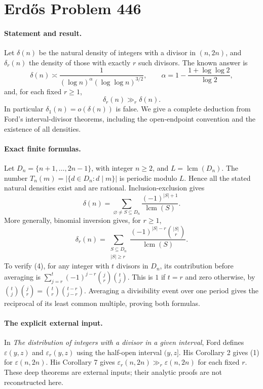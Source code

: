 \section*{Erd\H{o}s Problem 446}

\paragraph{Statement and result.}
Let \(\delta(n)\) be the natural density of integers with a divisor in
\((n,2n)\), and \(\delta_r(n)\) the density of those with exactly
\(r\) such divisors. The known answer is
\[
 \delta(n)\asymp
 \frac1{(\log n)^\alpha(\log\log n)^{3/2}},\qquad
 \alpha=1-\frac{1+\log\log2}{\log2},
 \tag{1}
\]
and, for each fixed \(r\geq1\),
\[
 \delta_r(n)\gg_r\delta(n).
 \tag{2}
\]
In particular \(\delta_1(n)=o(\delta(n))\) is false.
We give a complete deduction from Ford's interval-divisor theorems,
including the open-endpoint convention and the existence of all densities.

\paragraph{Exact finite formulas.}
Let \(D_n=\{n+1,\ldots,2n-1\}\), with integer \(n\geq2\), and
\(L=\operatorname{lcm}(D_n)\).
The number \(T_n(m)=|\{d\in D_n:d\mid m\}|\) is periodic modulo \(L\).
Hence all the stated natural densities exist and are rational.
Inclusion-exclusion gives
\[
 \delta(n)=
 \sum_{\varnothing\ne S\subseteq D_n}
 \frac{(-1)^{|S|+1}}{\operatorname{lcm}(S)}.
 \tag{3}
\]
More generally, binomial inversion gives, for \(r\geq1\),
\[
 \delta_r(n)=
 \sum_{\substack{S\subseteq D_n\\|S|\geq r}}
 \frac{(-1)^{|S|-r}\binom{|S|}{r}}{\operatorname{lcm}(S)}.
 \tag{4}
\]
To verify (4), for any integer with \(t\) divisors in \(D_n\), its
contribution before averaging is
\(\sum_{j=r}^{t}(-1)^{j-r}\binom jr\binom tj\).
This is \(1\) if \(t=r\) and zero otherwise, by
\(\binom tj\binom jr=\binom tr\binom{t-r}{j-r}\).
Averaging a divisibility event over one period gives the reciprocal
of its least common multiple, proving both formulas.

\paragraph{The explicit external input.}
In \emph{The distribution of integers with a divisor in a given interval},
Ford defines \(\varepsilon(y,z)\) and \(\varepsilon_r(y,z)\) using
the half-open interval \((y,z]\).
His Corollary 2 gives (1) for \(\varepsilon(n,2n)\).
His Corollary 7 gives
\(\varepsilon_r(n,2n)\gg_r\varepsilon(n,2n)\) for each fixed \(r\).
These deep theorems are external inputs; their analytic proofs are
not reconstructed here.

